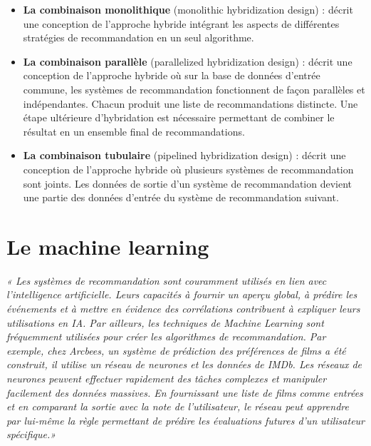 \begin{itemize}
    \item \textbf{La combinaison monolithique} (monolithic hybridization design)\supercite{elsaNegre} : décrit une conception de l'approche hybride intégrant les aspects de différentes stratégies de recommandation en un seul algorithme.
    \vspace{2mm}
    \item \textbf{La combinaison parallèle} (parallelized hybridization design)\supercite{elsaNegre} : décrit une conception de l'approche hybride où sur la base de données d’entrée commune, les systèmes de recommandation fonctionnent de façon parallèles et indépendantes. Chacun produit une liste de recommandations distincte. Une étape ultérieure d’hybridation est nécessaire permettant de combiner le résultat en un ensemble final de recommandations.
    \vspace{2mm}
    \item \textbf{La combinaison tubulaire} (pipelined hybridization design)\supercite{elsaNegre} : décrit une conception de l'approche hybride où plusieurs systèmes de recommandation sont joints. Les données de sortie d’un système de recommandation devient une partie des données d’entrée du système de recommandation suivant.
    
\end{itemize}

\vspace{5mm}

\section{Le machine learning}


\textit{«
Les systèmes de recommandation sont couramment utilisés en lien avec l’intelligence artificielle. Leurs capacités à fournir un aperçu global, à prédire les événements et à mettre en évidence des corrélations contribuent à expliquer leurs utilisations en IA. Par ailleurs, les techniques de Machine Learning sont fréquemment utilisées pour créer les algorithmes de recommandation. Par exemple, chez Arcbees, un système de prédiction des préférences de films a été construit, il utilise un réseau de neurones et les données de IMDb. Les réseaux de neurones peuvent effectuer rapidement des tâches complexes et manipuler facilement des données massives. En fournissant une liste de films comme entrées et en comparant la sortie avec la note de l’utilisateur, le réseau peut apprendre par lui-même la règle permettant de prédire les évaluations futures d’un utilisateur spécifique.»}\supercite{MachineLearn}

